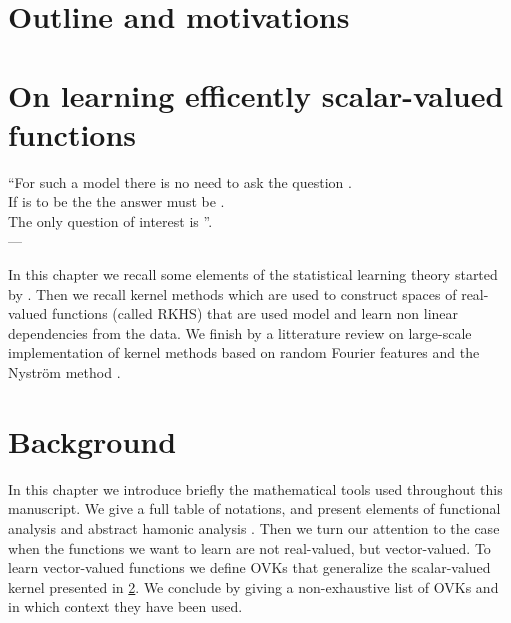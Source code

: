\chapter{Outline and motivations}
\label{ch:motivations}


\chapter{On learning efficently scalar-valued functions}
\label{ch:motivations}
\bigskip
\begin{flushright}
    ``For such a model there is no need to ask the question . \\
    If  is to be the  the answer must
    be . \\
    The only question of interest is ''. \\
    --- 
    \citep{box1979robustness}
\end{flushright}
\bigskip
\begin{justify}
    In this chapter we recall some elements of the statistical learning theory
    started by \citet{Vapnik1998}.  Then we recall kernel methods
    \citep{Aronszajn1950} which are used to construct spaces of real-valued
    functions (called RKHS) that are used model and learn non linear
    dependencies from the data. We finish by a litterature review on
    large-scale implementation of kernel methods based on random Fourier
    features \citep{Rahimi2007} and the Nystr\"om method
    \citep{Williams2000-nystrom}.
\end{justify}
\minitoc


\chapter{Background}
\label{ch:background}
\bigskip
\begin{justify}
    In this chapter we introduce briefly the mathematical tools used throughout
    this manuscript. We give a full table of notations, and present elements of
    functional analysis \citep{kurdila2006convex} and abstract hamonic analysis
    \citep{folland1994course}. Then we turn our attention to the case when the
    functions we want to learn are not real-valued, but vector-valued.  To
    learn vector-valued functions we define \aclp{OVK} that generalize the
    scalar-valued kernel presented in \cref{ch:motivations}. We conclude by
    giving a non-exhaustive list of \aclp{OVK} and in which context they have
    been used.
\end{justify}
\minitoc

